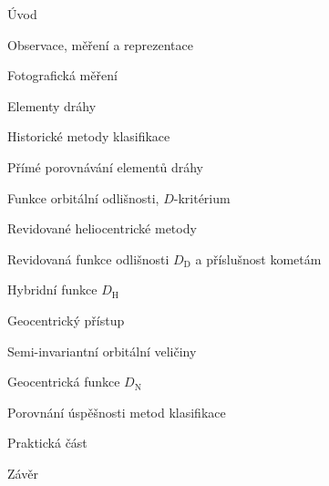 \documentclass[]{./MFFPrace}
\begin{document}
    \maketitle
    \tableofcontents
    \begin{todolist}
        \pagebreak
        \item Úvod
        \item Observace, měření a reprezentace
        \begin{todolist}
            \item Fotografická měření \cite{ceplecha}
            \item Elementy dráhy  \cite[743--744]{newapproach}
        \end{todolist}
        \item Historické metody klasifikace
        \begin{todolist}
            \item Přímé porovnávání elementů dráhy \cite{radiosurvey}
            \item Funkce orbitální odlišnosti, $D$-kritérium \cite{dsh} \cite[220]{radiosurvey} \cite[604]{remarks} \cite{newapproach} \cite[623]{galligan}
        \end{todolist}
        \item Revidované heliocentrické metody
        \begin{todolist}
            \item Revidovaná funkce odlišnosti $D_\text{D}$ a příslušnost kometám \cite{remarks} \cite{newapproach} \cite{galligan} \cite{cometassoc}
            \item Hybridní funkce $D_\text{H}$ \cite{remarks}
        \end{todolist}
        \item Geocentrický přístup
        \begin{todolist}
            \item Semi-invariantní orbitální veličiny \cite{newapproach}
            \item Geocentrická funkce $D_\text{N}$ \cite{newapproach}
        \end{todolist}
        \item Porovnání úspěšnosti metod klasifikace \cite{galligan}
        \item Praktická část
        \item Závěr
    \end{todolist}
    \noindent
    \\
\end{document}
